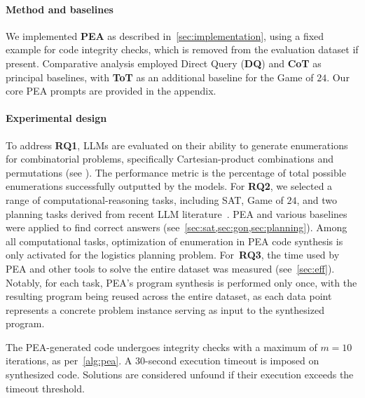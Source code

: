 \paragraph{Method and baselines} We implemented \textbf{PEA} as described in~\cref{sec:implementation}, using a fixed example for code integrity checks, which is removed from the evaluation dataset if present. Comparative analysis employed Direct Query (\textbf{DQ}) and \textbf{CoT} as principal baselines, with \textbf{ToT} as an additional baseline for the Game of $24$. Our core PEA prompts are provided in the appendix.

\paragraph{Experimental design}
To address \textbf{RQ1}, LLMs are evaluated on their ability to generate enumerations for combinatorial problems, specifically Cartesian-product combinations and permutations (see ).
%
The performance metric is the percentage of total possible enumerations successfully outputted by the models.
For \textbf{RQ2}, we selected a range of computational-reasoning tasks, including SAT, Game of $24$, and two planning tasks derived from recent LLM literature~\citep{marino2024fastanalysisopenaio1preview,yao2023tree,valmeekam2023planbench}. PEA and 
various
baselines were applied to find correct answers (see~\cref{sec:sat,sec:gon,sec:planning}). Among all computational tasks, optimization of enumeration in PEA code synthesis is only activated for the logistics planning problem. For~\textbf{RQ3}, the time used by PEA and other tools to solve the entire dataset was measured (see~\cref{sec:eff}). Notably, for each task, PEA's program synthesis is performed only once, with the resulting program being reused across the entire dataset, as each data point represents a concrete problem instance serving as input to the synthesized program.

The PEA-generated code undergoes integrity checks with a maximum of $m=10$ iterations, as 
per~\cref{alg:pea}.
A $30$-second execution timeout is imposed on synthesized code. Solutions are considered unfound if their execution exceeds 
the timeout threshold.


